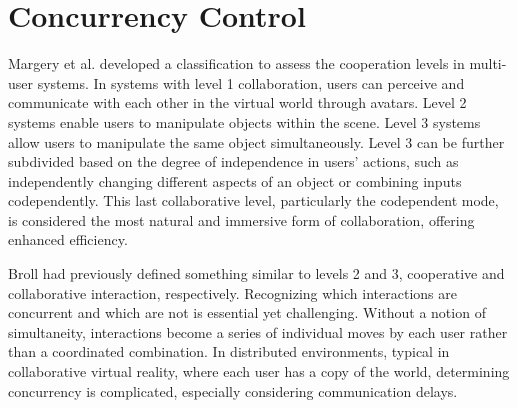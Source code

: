 \section{Concurrency Control} \label{sec:sota_concurrency}

    Margery et al. \cite{margeryGeneralFrameworkCooperative1999} developed a classification to assess the cooperation levels in multi-user systems. In systems with level 1 collaboration, users can perceive and communicate with each other in the virtual world through avatars. Level 2 systems enable users to manipulate objects within the scene. Level 3 systems allow users to manipulate the same object simultaneously. Level 3 can be further subdivided based on the degree of independence in users' actions, such as independently changing different aspects of an object or combining inputs codependently. This last collaborative level, particularly the codependent mode, is considered the most natural and immersive form of collaboration, offering enhanced efficiency.
    
    Broll \cite{brollInteractingDistributedCollaborative1995} had previously defined something similar to levels 2 and 3, cooperative and collaborative interaction, respectively. Recognizing which interactions are concurrent and which are not is essential yet challenging. Without a notion of simultaneity, interactions become a series of individual moves by each user rather than a coordinated combination. In distributed environments, typical in collaborative virtual reality, where each user has a copy of the world, determining concurrency is complicated, especially considering communication delays.
 
